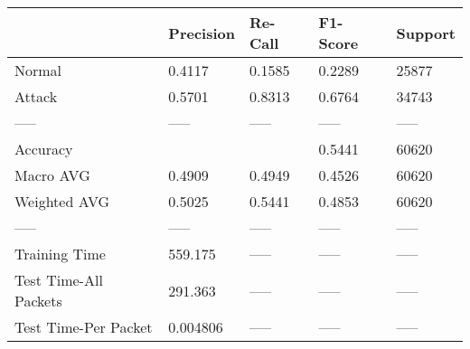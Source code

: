 \begin{tabular}{lllll}
\toprule
{} & Precision & Re-Call & F1-Score & Support \\
\midrule
Normal                &    0.4117 &  0.1585 &   0.2289 &   25877 \\
Attack                &    0.5701 &  0.8313 &   0.6764 &   34743 \\
-----                 &     ----- &   ----- &    ----- &   ----- \\
Accuracy              &           &         &   0.5441 &   60620 \\
Macro AVG             &    0.4909 &  0.4949 &   0.4526 &   60620 \\
Weighted AVG          &    0.5025 &  0.5441 &   0.4853 &   60620 \\
-----                 &     ----- &   ----- &    ----- &   ----- \\
Training Time         &   559.175 &   ----- &    ----- &   ----- \\
Test Time-All Packets &   291.363 &   ----- &    ----- &   ----- \\
Test Time-Per Packet  &  0.004806 &   ----- &    ----- &   ----- \\
\bottomrule
\end{tabular}
